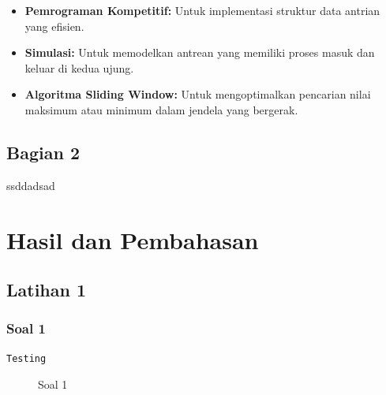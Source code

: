 \documentclass[a4paper,oneside,12pt]{book}
\begin{document}
\begin{itemize}

    \item \textbf{Pemrograman Kompetitif:} Untuk implementasi struktur data antrian yang efisien.


    \item \textbf{Simulasi:} Untuk memodelkan antrean yang memiliki proses masuk dan keluar di kedua ujung.


    \item \textbf{Algoritma Sliding Window:} Untuk mengoptimalkan pencarian nilai maksimum atau minimum dalam jendela yang bergerak.

\end{itemize}

\section{Bagian 2}
ssddadsad



\chapter*{Hasil dan Pembahasan}
\setcounter{chapter}{3}
\setcounter{section}{0}
\section{Latihan 1}

\subsection{Soal 1}

\begin{lstlisting}[language=Python, style=pythonstyle]
Testing
\end{lstlisting}

\begin{figure}[H]
\centering
{}
\caption{Soal 1}
\label{fig:1_1}
\end{figure}
\end{document}
